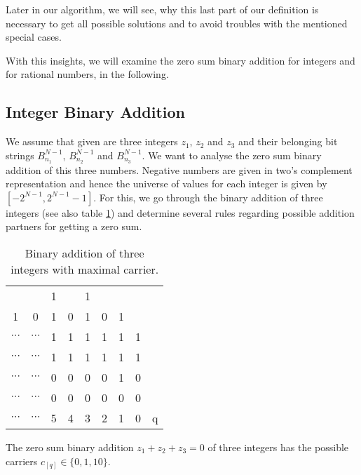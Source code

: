 Later in our algorithm, we will see, why this last part of our definition is necessary to get all possible solutions and to avoid troubles with the mentioned special cases.

With this insights, we will examine the zero sum binary addition for integers and for rational numbers, in the following.
\subsection{Integer Binary Addition}
\label{ss:integerbinaryaddition}
We assume that given are three integers $z_{1}$, $z_{2}$ and $z_{3}$ and their belonging bit strings $B^{N-1}_{n_{1}}$, $B^{N-1}_{n_{2}}$ and $B^{N-1}_{n_{3}}$. We want to analyse the zero sum binary addition of this three numbers. Negative numbers are given in two's complement representation and hence the universe of values for each integer is given by $[-2^{N-1}, 2^{N-1} - 1]$. For this, we go through the binary addition of three integers (see also table \ref{tab:binaddthreeintmaxcarrier}) and determine several rules regarding possible addition partners for getting a zero sum.

\begin{table}[htp]
\caption{Binary addition of three integers with maximal carrier.}
\label{tab:binaddthreeintmaxcarrier}
\centering
\vspace{0.3cm}
    \begin{tabular}{ccccccccc}
         &  & 1 &  & 1 &  &  & & \\
        1 & 0 & 1 & 0 & 1 & 0 & 1 & & \\
        \hline
        $\cdots$ & $\cdots$ & 1 & 1 & 1 & 1 & 1 & 1 & \\
        $\cdots$ & $\cdots$ & 1 & 1 & 1 & 1 & 1 & 1 & \\
        $\cdots$ & $\cdots$ & 0 & 0 & 0 & 0 & 1 & 0 & \\
        \hline
        $\cdots$ & $\cdots$ & 0 & 0 & 0 & 0 & 0 & 0 & \\
        $\cdots$ & $\cdots$ & \footnotesize{5} & \footnotesize{4} & \footnotesize{3} & \footnotesize{2} & \footnotesize{1} & \footnotesize{0} & \footnotesize{q}\\
    \end{tabular}
\end{table}

\begin{theorem}[Carriers $c_{[q]}$]
    The zero sum binary addition $z_{1} + z_{2} + z_{3} = 0$ of three integers has the possible carriers $c_{[q]} \in \{0, 1, 10\}$.
\label{theorem:carriers}
\end{theorem}

